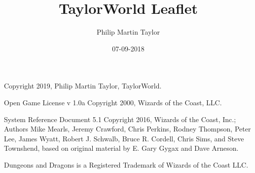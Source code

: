 \documentclass[10pt]{extreport}
\date{07-09-2018}
\author{Philip Martin Taylor}
\title{TaylorWorld Leaflet}
\begin{document}
\begin{center}
  Copyright 2019, Philip Martin Taylor, TaylorWorld.
\end{center}
\begin{center}
  Open Game License v 1.0a Copyright 2000, Wizards of the Coast, LLC.
\end{center}
\begin{center}
  System Reference Document 5.1 Copyright 2016, Wizards of the Coast, Inc.; Authors Mike Mearls, Jeremy Crawford, Chris Perkins, Rodney Thompson, Peter Lee, James Wyatt, Robert J. Schwalb, Bruce R. Cordell, Chris Sims, and Steve Townshend, based on original material by E. Gary Gygax and Dave Arneson.
\end{center}
\begin{center}
  Dungeons and Dragons is a Registered Trademark of Wizards of the Coast LLC. 
\end{center}
\end{document}
